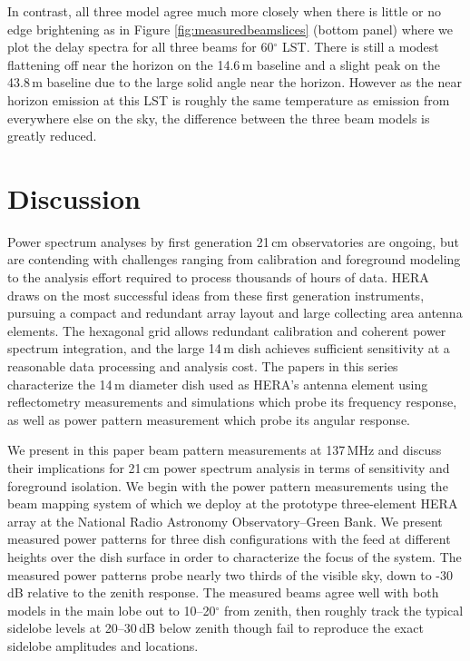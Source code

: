 \documentclass{emulateapj}
\begin{document}
In contrast, all three model agree much more closely when there is little or no edge brightening as in Figure \ref{fig:measuredbeamslices} (bottom panel) where we plot the delay spectra for all three beams for 60$^\circ$ LST. There is still a modest flattening off near the horizon on the 14.6\,m baseline and a slight peak on the 43.8\,m baseline due to the large solid angle near the horizon. However as the near horizon emission at this LST is roughly the same temperature as emission from everywhere else on the sky, the difference between the three beam models is greatly reduced.

\section{Discussion}


Power spectrum analyses by first generation 21\,cm observatories are ongoing, but are contending with challenges ranging from calibration and foreground modeling to the analysis effort required to process thousands of hours of data. HERA draws on the most successful ideas from these first generation instruments, pursuing a compact and redundant array layout and large collecting area antenna elements. The hexagonal grid allows redundant calibration and coherent power spectrum integration, and the large 14\,m dish achieves sufficient sensitivity at a reasonable data processing and analysis cost. The papers in this series characterize the 14\,m diameter dish used as HERA's antenna element using reflectometry measurements and simulations which probe its frequency response, as well as power pattern measurement which probe its angular response. 


We present in this paper beam pattern measurements at 137\,MHz and discuss their implications for 21\,cm power spectrum analysis in terms of sensitivity and foreground isolation. We begin with the power pattern measurements using the beam mapping system of \citet{neben15} which we deploy at the prototype three-element HERA array at the National Radio Astronomy Observatory--Green Bank. We present measured power patterns for three dish configurations with the feed at different heights over the dish surface in order to characterize the focus of the system. The measured power patterns probe nearly two thirds of the visible sky, down to -30\,dB relative to the zenith response. The measured beams agree well with both models in the main lobe out to 10--20$^\circ$ from zenith, then roughly track the typical sidelobe levels at 20--30\,dB below zenith though fail to reproduce the exact sidelobe amplitudes and locations. 
\end{document}

